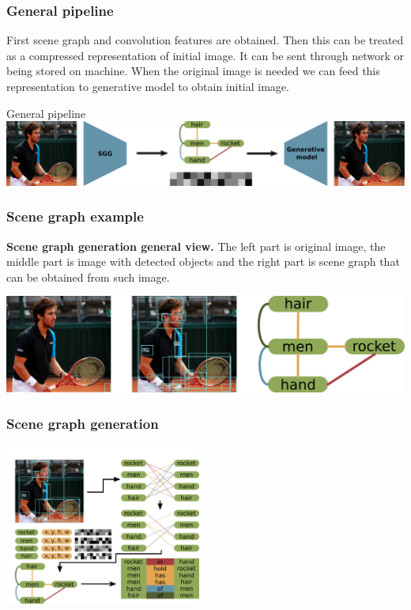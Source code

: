 \documentclass[10pt]{beamer}
\begin{document}
\begin{frame}
    \frametitle{General pipeline}

    First scene graph and convolution features are obtained. Then this can be treated as a compressed representation of initial image. It can be sent through network or being stored on machine. When the original image is needed we can feed this representation to generative model to obtain initial image.

    \begin{block}{General pipeline}
        \includegraphics[width=\textwidth]{figure/application-general-pipeline.png}
    \end{block}
\end{frame}

\begin{frame}
    \frametitle{Scene graph example}

    \textbf{Scene graph generation general view.} The left part is original image, the middle part is image with detected objects and the right part is scene graph that can be obtained from such image.

    \begin{block}{}
        \includegraphics[width=\textwidth]{figure/scene-graph-example.png}
    \end{block}
\end{frame}

\begin{frame}
    \frametitle{Scene graph generation}

    \includegraphics[height=150pt]{figure/sgg-pipeline.png}

\end{frame}
\end{document}
